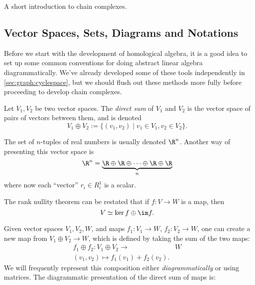 
\cleartoverso 
{}
\label{chap:homologicalalgebra}

\begin{elevator}
	A short introduction to chain complexes.
\end{elevator}

\label{sec:chaincomplexes:intro}
\subsection{Vector Spaces, Sets, Diagrams and Notations}
Before we start with the development of homological algebra, it is a good idea to set up some common conventions for doing abstract linear algebra diagrammatically. We've already developed some of these tools independently in \ref{sec:graph:cyclespace}, but we should flush out these methods more fully before proceeding to develop chain complexes. \\
\begin{definition}
Let $V_1, V_2$ be two vector spaces. The \emph{direct sum} of $V_1$ and $V_2$ is the vector space of pairs of vectors between them, and is denoted 
\[V_1\oplus V_2:=\{(v_1, v_2)\;|\; v_1\in V_1, v_2\in V_2\}.\]
\end{definition}
\begin{example}
The set of $n$-tuples of real numbers is usually denoted $\R^n$. Another way of presenting this vector space is 
\[\R^n=\underbrace{\R\oplus \R \oplus \cdots \oplus \R\oplus \R}_n\]
where now each ``vector'' $r_i\in R^1_i$ is a scalar. 
\end{example}
\begin{example}The rank nullity theorem can be restated that if $f: V\to W$ is a map, then 
\[V\simeq \ker f\oplus \im f. \]
\end{example}
Given vector spaces $V_1, V_2, W$, and maps $f_1: V_1\to W$, $f_2: V_2\to W$, one can create a new map from $V_1\oplus V_2\to W$, which is defined by taking the sum of the two maps:
\begin{align*}
f_1\oplus f_2: V_1\oplus V_2 \to&  W\\
(v_1, v_2)\mapsto f_1(v_1)+f_2(v_2).
\end{align*}
We will frequently represent this composition either \emph{diagrammatically} or {using matrices.} The diagrammatic presentation of the direct sum of maps is:

